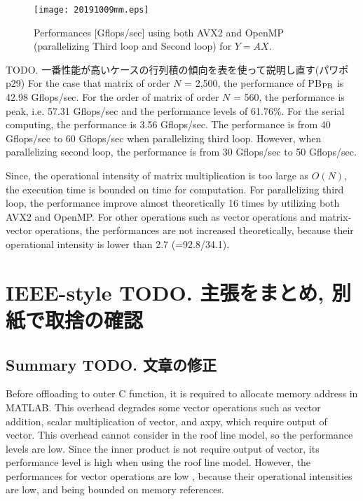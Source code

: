 \documentclass{IOS-Book-Article}
\begin{document}
\begin{figure}[htbp]
  \begin{center}
    \texttt{[image: 20191009mm.eps]}
         \caption{Performances [Gflops/sec] using both AVX2 and OpenMP (parallelizing Third loop and Second loop) for $Y = AX$.}
    \label{figMM3}
  \end{center}
\end{figure}

TODO. 一番性能が高いケースの行列積の傾向を表を使って説明し直す(パワポp29)
For the case that matrix of order $N$ = 2,500, the performance of PB$_{\rm{PB}}$ is 42.98 Gflops/sec.
For the order of matrix of order $N$ = 560, the performance is peak, i.e. 57.31 Gflops/sec and the performance levels of 61.76\%. For the serial computing, the performance is 3.56 Gflops/sec.
The performance is from 40 Gflops/sec to 60 Gflops/sec when parallelizing third loop. However, when parallelizing second loop, the performance is from 30 Gflops/sec to 50 Gflops/sec. 

Since, the operational intensity of matrix multiplication is too large as $O(N)$, the execution time is bounded on time for computation. For parallelizing third loop, the performance improve almost theoretically 16 times by utilizing both AVX2 and OpenMP.
For other operations such as vector operations and matrix-vector operations, the performances are not increased theoretically, because their operational intensity is lower than 2.7 (=92.8/34.1). %

\section{IEEE-style TODO. 主張をまとめ, 別紙で取捨の確認}

\subsection{Summary TODO. 文章の修正}

Before offloading to outer C function, it is required to allocate memory address in MATLAB. This overhead degrades some vector operations such as vector addition, scalar multiplication of vector, and axpy, which require output of vector. This overhead cannot consider in the roof line model, so the performance levels are low. Since the inner product is not require output of vector, its performance level is high when using the roof line model. However, the performances for vector operations are low , because their operational intensities are low, and being bounded on memory references.
\end{document}
